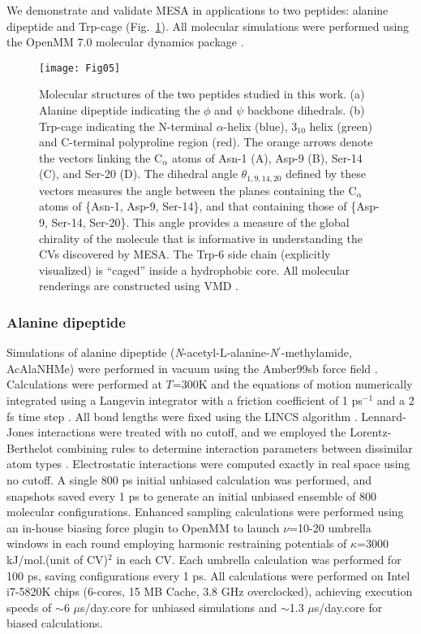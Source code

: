 \documentclass[12pt]{article}
\newcommand*{\blauw}[1]{#1}
\begin{document}
We demonstrate and validate MESA in applications to two peptides: alanine dipeptide and Trp-cage (\blauw{Fig.~\ref{AD}}). All molecular simulations were performed using the OpenMM 7.0 molecular dynamics package \cite{eastman2017openmm,eastman2012openmm,friedrichs2009accelerating}.

\begin{figure}[ht!]
\begin{center}
\texttt{[image: Fig05]}
\caption{Molecular structures of the two peptides studied in this work. (a) Alanine dipeptide indicating the $\phi$ and $\psi$ backbone dihedrals. (b) Trp-cage indicating the N-terminal $\alpha$-helix (blue), $3_{10}$ helix (green) and C-terminal polyproline region (red). The orange arrows denote the vectors linking the $\mathrm{C}_\alpha$ atoms of Asn-1 (A), Asp-9 (B), Ser-14 (C), and Ser-20 (D). The dihedral angle $\theta_{1,9,14,20}$ defined by these vectors measures the angle between the planes containing the $\mathrm{C}_\alpha$ atoms of \{Asn-1, Asp-9, Ser-14\}, and that containing those of \{Asp-9, Ser-14, Ser-20\}. This angle provides a measure of the global chirality of the molecule that is informative in understanding the CVs discovered by MESA. The Trp-6 side chain (explicitly visualized) is ``caged'' inside a hydrophobic core. All molecular renderings are constructed using VMD \cite{humphrey1996vmd}.}\label{AD}
\end{center}
\end{figure}

\subsubsection{\sffamily \normalsize Alanine dipeptide} \label{sec:methAla}

Simulations of alanine dipeptide (\textit{N}-acetyl-L-alanine-\textit{N}$^\prime$-methylamide, AcAlaNHMe) were performed in vacuum using the Amber99sb force field \cite{wang2004development}. Calculations were performed at $T$=300K and the equations of motion numerically integrated using a Langevin integrator with a friction coefficient of 1 ps$^{-1}$ and a 2 fs time step \cite{schlick2010molecular}. All bond lengths were fixed using the LINCS algorithm \cite{hess1997lincs}. Lennard-Jones interactions were treated with no cutoff, and we employed the Lorentz-Berthelot combining rules to determine interaction parameters between dissimilar atom types \cite{allenoxford}. Electrostatic interactions were computed exactly in real space using no cutoff. A single 800 ps initial unbiased calculation was performed, and snapshots saved every 1 ps to generate an initial unbiased ensemble of 800 molecular configurations. Enhanced sampling calculations were performed using an in-house biasing force plugin to OpenMM to launch $\nu$=10-20 umbrella windows in each round employing harmonic restraining potentials of $\kappa$=3000 kJ/mol.(unit of CV)$^2$ in each CV. Each umbrella calculation was performed for 100 ps, saving configurations every 1 ps. All calculations were performed on Intel i7-5820K chips (6-cores, 15 MB Cache, 3.8 GHz overclocked), achieving execution speeds of $\sim$6 $\mu$s/day.core for unbiased simulations and $\sim$1.3 $\mu$s/day.core for biased calculations.
\end{document}
